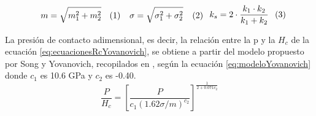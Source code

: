\begin{subequations}
\begin{minipage}{0.298\textwidth}
\begin{equation}
m=\sqrt{m_1^2+m_2^2}
\label{eq:mRMS}
\end{equation}
\end{minipage}
\hfill
\begin{minipage}{0.28\textwidth}
\begin{equation}
\sigma=\sqrt{\sigma_1^2+\sigma_2^2}
\label{eq:sigmaRMS}
\end{equation}
\end{minipage}
\hfill
\begin{minipage}{0.28\textwidth}
\begin{equation}
k_s=2\cdot \frac{k_1\cdot k_2}{k_1+k_2}
\label{eq:condArmonica}
\end{equation}
\end{minipage}
\label{eqs:RMS}
\end{subequations}


La presión de contacto adimensional, es decir, la relación entre la \gls{p} y la $H_c$ de la ecuación \eqref{eq:ecuacionesRcYovanovich}, se obtiene a partir del modelo propuesto por Song y Yovanovich, recopilados en \cite{experimental_Rc_SS}, según la ecuación \eqref{eq:modeloYovanovich} donde $c_1$ es 10.6 GPa y $c_2$ es -0.40.
\begin{equation}
\dfrac{P}{H_c}=\left[ \dfrac{P}{c_1\left(1.62\sigma/m\right)^{c_2}} \right]^{\frac{1}{2+0.071c_2}}
\label{eq:modeloYovanovich}
\end{equation}

